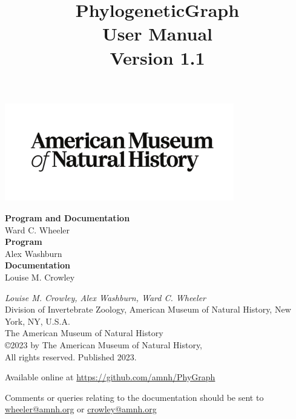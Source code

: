 \documentclass[11pt]{book}
\begin{document}
	
	\title{PhylogeneticGraph\\User Manual\\Version 1.1}
	
	\maketitle 
	
	\newpage

	 \begin{center}
		\includegraphics[width=0.75\textwidth]{AMNHLogo.PDF}
	\end{center}

	\vspace*{2.50cm}
		
	\begin{flushleft}
		\textbf {Program and Documentation} \\ Ward C. Wheeler \\
		\vspace*{0.50cm}
		\textbf {Program} \\ Alex Washburn \\
		\vspace*{0.50cm}
		\textbf{Documentation} \\ Louise M. Crowley
	\end{flushleft}
	

	\vspace*{2.50cm}
	
	\begin{flushleft}
		\small
		{\it Louise M. Crowley, Alex Washburn, Ward C. Wheeler} \\
		
		Division of Invertebrate Zoology, American Museum of Natural History, New York, NY, U.S.A.\\
		\smallskip
		The American Museum of Natural History\\
		\copyright 2023 by The American Museum of Natural History, \\
		All rights reserved. Published 2023.
			
		\vspace*{0.25cm}
		
		Available online at \url{https://github.com/amnh/PhyGraph}
		
		Comments or queries relating to the documentation should be sent to \href{mailto:wheeler@amnh.org}
		{wheeler@amnh.org} or \href{mailto:crowley@amnh.org}{crowley@amnh.org}
	\end{flushleft}
	
\end{document}
